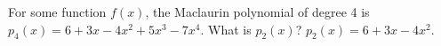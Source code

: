 {For some function $f(x)$, the Maclaurin polynomial of degree 4 is $p_4(x) = 6+3x-4x^2+5x^3-7x^4$. What is $p_2(x)$?
}
{$p_2(x) = 6+3x-4x^2$.
}